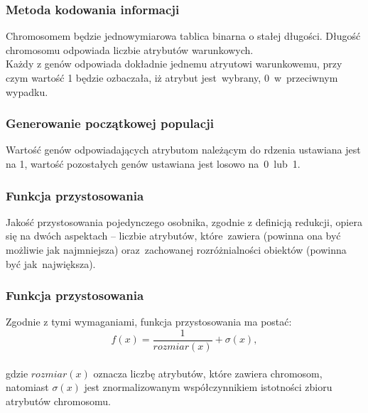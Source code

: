 \documentclass[10pt]{beamer}
\begin{document}
\begin{frame}
\frametitle{Metoda kodowania informacji}
\begin{spacing}{1.5}
\begin{flushleft}
Chromosomem będzie jednowymiarowa tablica binarna o stałej długości. Długość chromosomu odpowiada liczbie atrybutów warunkowych.\\
Każdy z genów odpowiada dokładnie jednemu atryutowi warunkowemu, przy czym wartość 1 będzie ozbaczała, iż atrybut jest~wybrany,
0~w~przeciwnym wypadku.
\end{flushleft}
\end{spacing}

\end{frame}


\begin{frame}
\frametitle{Generowanie początkowej populacji}
\begin{spacing}{1.5}
\begin{flushleft}
Wartość genów odpowiadających atrybutom należącym do rdzenia ustawiana jest na 1, wartość pozostałych genów ustawiana jest losowo 
na~0~lub~1.
\end{flushleft}
\end{spacing}

\end{frame}


\begin{frame}
\frametitle{Funkcja przystosowania}
\begin{spacing}{1.5}
\begin{flushleft}
Jakość przystosowania pojedynczego osobnika, zgodnie z definicją redukcji, opiera się na dwóch aspektach -- liczbie atrybutów, które~zawiera (powinna ona być możliwie jak najmniejsza) oraz~zachowanej rozróżnialności obiektów (powinna być jak~największa).
\end{flushleft}
\end{spacing}

\end{frame}


\begin{frame}
\frametitle{Funkcja przystosowania}
\begin{spacing}{1.5}
\begin{flushleft}
Zgodnie z tymi wymaganiami, funkcja przystosowania ma postać:\\
$$f(x) = {\frac{1}{rozmiar(x)}} + \sigma(x),$$\\
gdzie $rozmiar(x)$ oznacza liczbę atrybutów, które zawiera chromosom,  natomiast $\sigma(x)$ jest znormalizowanym współczynnikiem istotności zbioru atrybutów chromosomu.

\end{flushleft}
\end{spacing}

\end{frame}
\end{document}
